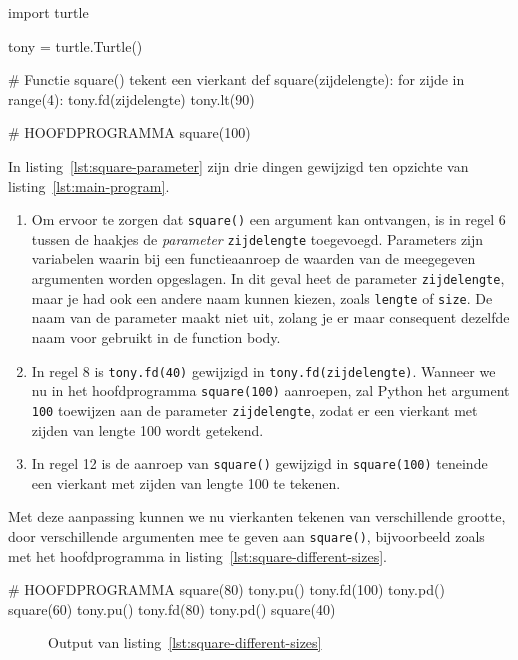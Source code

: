 \documentclass[../main]{subfiles}
\begin{document}
\begin{python}[style=mu, caption={Functie \texttt{square()} met parameter \texttt{zijdelengte}}, label={lst:square-parameter}]
import turtle

tony = turtle.Turtle()

# Functie square() tekent een vierkant
def square(zijdelengte):
    for zijde in range(4):
        tony.fd(zijdelengte)
        tony.lt(90)

# HOOFDPROGRAMMA
square(100)
\end{python}
\clearpage
In listing~\ref{lst:square-parameter} zijn drie dingen gewijzigd ten opzichte van listing~\ref{lst:main-program}.
\begin{enumerate}
\item Om ervoor te zorgen dat \texttt{square()} een argument kan ontvangen, is in regel 6 tussen de haakjes de \emph{parameter} \texttt{zijdelengte} toegevoegd. Parameters zijn variabelen waarin bij een functieaanroep de waarden van de meegegeven argumenten worden opgeslagen. In dit geval heet de parameter \texttt{zijdelengte}, maar je had ook een andere naam kunnen kiezen, zoals \texttt{lengte} of \texttt{size}. De naam van de parameter maakt niet uit, zolang je er maar consequent dezelfde naam voor gebruikt in de function body.
\item In regel 8 is \texttt{tony.fd(40)} gewijzigd in \texttt{tony.fd(zijdelengte)}. Wanneer we nu in het hoofdprogramma \texttt{square(100)} aanroepen, zal Python het argument \texttt{100} toewijzen aan de parameter \texttt{zijdelengte}, zodat er een vierkant met zijden van lengte 100 wordt getekend.
\item In regel 12 is de aanroep van \texttt{square()} gewijzigd in \texttt{square(100)} teneinde een vierkant met zijden van lengte 100 te tekenen.
\end{enumerate}

Met deze aanpassing kunnen we nu vierkanten tekenen van verschillende grootte, door verschillende argumenten mee te geven aan \texttt{square()}, bijvoorbeeld zoals met het hoofdprogramma in listing~\ref{lst:square-different-sizes}.

\begin{python}[style=mu, caption={Vierkanten met verschillende grootte}, label={lst:square-different-sizes}, firstnumber=11]
# HOOFDPROGRAMMA
square(80)
tony.pu()
tony.fd(100)
tony.pd()
square(60)
tony.pu()
tony.fd(80)
tony.pd()
square(40)
\end{python}

\begin{figure}[ht]
    \centering
    \caption{Output van listing~\ref{lst:square-different-sizes}}%
    \label{fig:different-squares}
\end{figure}
\end{document}
